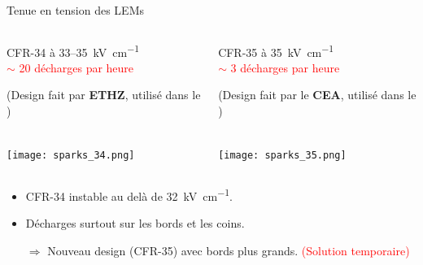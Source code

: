     \begin{frame}{Tenue en tension des LEMs}
   		\begin{columns}
    		\begin{column}{0.5\textwidth}
    			\begin{center}
	    			\begin{scriptsize}
		    			CFR-34 à 33--\SI{35}{\kilo\volt\per\centi\meter}\\
		    			\textcolor{red}{$\sim$ 20 décharges par heure}\\
		    		\end{scriptsize}
	    			\begin{tiny}
		    			(Design fait par \textbf{ETHZ}, utilisé dans le \TOO{})
		    		\end{tiny}\\
	    			\texttt{[image: sparks\_34.png]}
    			\end{center}
    		\end{column}\hfill
    		\begin{column}{0.5\textwidth}
    			\begin{center}
	    			\begin{scriptsize}
		    			CFR-35 à \SI{35}{\kilo\volt\per\centi\meter} \\
		    			\textcolor{red}{$\sim$ 3 décharges par heure}\\
		    		\end{scriptsize}
	    			\begin{tiny}
	    				(Design fait par le \textbf{CEA}, utilisé dans le \SSS{})
	   				\end{tiny}\\
	    			\texttt{[image: sparks\_35.png]}
	    		\end{center}
    		\end{column}
    	\end{columns}\vspace{0.1cm}
    	\begin{columns}
    		\begin{column}{0.5\textwidth}
    			\begin{scriptsize}
	    			\begin{itemize}
	    				\item CFR-34 instable au delà de \SI{32}{\kilo\volt\per\centi\meter}.
	    				\item Décharges surtout sur les bords et les coins.
	    			\end{itemize}
	    			\begin{itemize}
	    				\item[$\Rightarrow$] Nouveau design (CFR-35) avec bords plus grands. \textcolor{red}{(Solution temporaire)}

\end{itemize}
\end{scriptsize}
\end{column}
\end{columns}
\end{frame}
